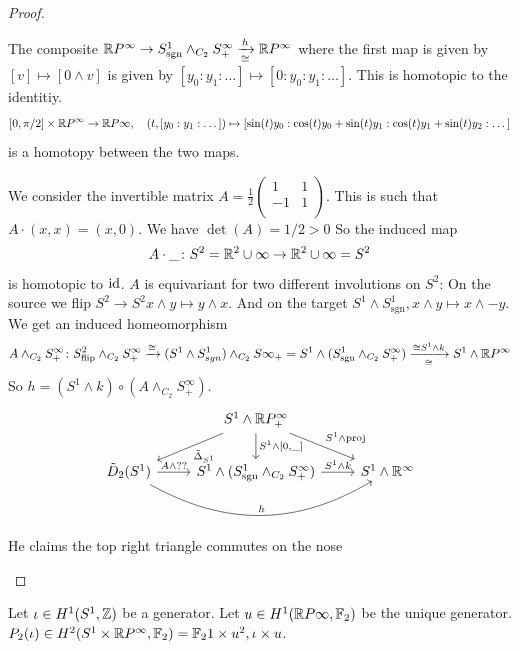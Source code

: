 \documentclass[language=english]{TemplateLecture}
\begin{document}
\begin{proof}
\begin{description}
        The composite \(\mathbb{R} P^\infty \to S^1_{\mathrm{sgn}}\wedge_{C_2} S^\infty_+ \xrightarrow[\cong]{h} \mathbb{R} P^\infty\) where the first map is given by \([v]\mapsto [0\wedge v]\) is given by \([y_0 : y_1 : \dots] \mapsto [0:y_0 : y_1:\dots]\). This is homotopic to the identitiy.
        \[[0, \pi/2]\times \mathbb{R} P^\infty \to \mathbb{R} P\infty, \quad (t, [y_0: y_1:\dots]) \mapsto [\sin(t)y_0 : \cos(t)y_0 + \sin(t)y_1 : \cos(t)y_1 + \sin(t)y_2 : \dots]\]
        is a homotopy between the two maps.
        \item[Step 2] We consider the invertible matrix \(A = \frac{1}{2} \begin{pmatrix}
            1 & 1 \\
            -1 & 1 \\
        \end{pmatrix}\). This is such that \(A \cdot(x,x) = (x,0)\). We have \(\det (A) = 1/2 > 0\) So the induced map
        \[A\cdot\_\colon S^2 = \mathbb{R} ^2\cup\infty \to \mathbb{R} ^2\cup \infty = S^2\]
        is homotopic to \(\operatorname{id}\). \(A\) is equivariant for two different involutions on \(S^2\): On the source we flip \(S^2\to S^2 x\wedge y \mapsto y\wedge x\). And on the target \(S^1 \wedge S^1_{\mathrm{sgn}}, x\wedge y \mapsto x\wedge -y\). We get an induced homeomorphism
        \[A\wedge_{C_2}S^\infty_+ \colon S^2_{\text{flip}} \wedge_{C_2}S^\infty_+ \xrightarrow{\cong} (S^1 \wedge S^1_{sgn})\wedge_{C_2}S\infty_+ = S^1 \wedge (S^1_{\mathrm{sgn}} \wedge _{C_2} S^\infty _+)\xrightarrow[\cong]{\cong S^1\wedge k}S^1 \wedge \mathbb{R} P^\infty\]
        So \(h = (S^1 \wedge k)\circ (A\wedge _{C_2} S^\infty_+)\).
        \[\begin{tikzcd}
            & S^1 \wedge \ir P^\infty_+ \ar[d, "{S^1 \wedge [0, \_]}"]\ar[dl, "\tilde \Delta_{S^1}"]\ar[dr, "S^1 \wedge \mathrm{proj}"] & \\
            \tilde D_2(S^1)\ar[rr, "h", bend right=30] \ar[r, "A\wedge ??"] & S^1 \wedge (S_{\mathrm{sgn}}^1\wedge_{C_2} S^\infty_+) \ar[r, "S^1 \wedge k"] & S^1 \wedge \ir^\infty \\
        \end{tikzcd}\]
        He claims the top right triangle commutes on the nose
    \end{description}
\end{proof}

Let \(\iota\in H^1(S^1, \mathbb{Z})\) be a generator. Let \(u \in H^1(\mathbb{R} P\infty, \mathbb{F}_2)\) be the unique generator. \(P_2(\iota) \in H^2(S^1\times \mathbb{R} P^\infty, \mathbb{F}_2) = \mathbb{F}_2{1\times u^2, \iota\times u}\).
\end{document}
